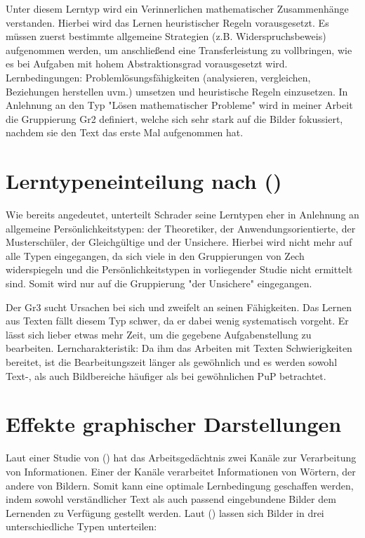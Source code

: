 Unter diesem Lerntyp wird ein Verinnerlichen mathematischer Zusammenhänge verstanden. Hierbei wird das Lernen heuristischer Regeln vorausgesetzt. Es müssen zuerst bestimmte allgemeine Strategien (z.B. Widerspruchsbeweis) aufgenommen werden, um anschließend eine Transferleistung zu vollbringen, wie es bei Aufgaben mit hohem Abstraktionsgrad vorausgesetzt wird. 
Lernbedingungen: Problemlösungsfähigkeiten (analysieren, vergleichen, Beziehungen herstellen uvm.) umsetzen und heuristische Regeln einzusetzen.
In Anlehnung an den Typ "Lösen mathematischer Probleme" wird in meiner Arbeit die Gruppierung \gls{Gr2} definiert, welche sich sehr stark auf die Bilder fokussiert, nachdem sie den Text das erste Mal aufgenommen hat.

\section{Lerntypeneinteilung nach \citeauthor{schrader2008lerntypen} ()}

Wie bereits angedeutet, unterteilt Schrader seine Lerntypen eher in Anlehnung an allgemeine Persönlichkeitstypen: der Theoretiker, der Anwendungsorientierte, der Musterschüler, der Gleichgültige und der Unsichere. Hierbei wird nicht mehr auf alle Typen eingegangen, da sich viele in den Gruppierungen von Zech widerspiegeln und die Persönlichkeitstypen in vorliegender Studie nicht ermittelt sind. Somit wird nur auf die Gruppierung "der Unsichere" eingegangen.

Der \gls{Gr3} sucht Ursachen bei sich und zweifelt an seinen Fähigkeiten. Das Lernen aus Texten fällt diesem Typ schwer, da er dabei wenig systematisch vorgeht. Er lässt sich lieber etwas mehr Zeit, um die gegebene Aufgabenstellung zu bearbeiten.
Lerncharakteristik: Da ihm das Arbeiten mit Texten Schwierigkeiten bereitet, ist die Bearbeitungszeit länger als gewöhnlich und es werden sowohl Text-, als auch Bildbereiche häufiger als bei gewöhnlichen \gls{PuP} betrachtet. 

\section{Effekte graphischer Darstellungen}

Laut einer Studie von \citeauthor{mayer2005reliability} () hat das Arbeitsgedächtnis zwei Kanäle zur Verarbeitung von Informationen. Einer der Kanäle verarbeitet Informationen von Wörtern, der andere von Bildern. Somit kann eine optimale Lernbedingung geschaffen werden, indem sowohl verständlicher Text als auch passend eingebundene Bilder dem Lernenden zu Verfügung gestellt werden. Laut \citeauthor{bockmannvalue} () lassen sich Bilder in drei unterschiedliche Typen unterteilen:
    
